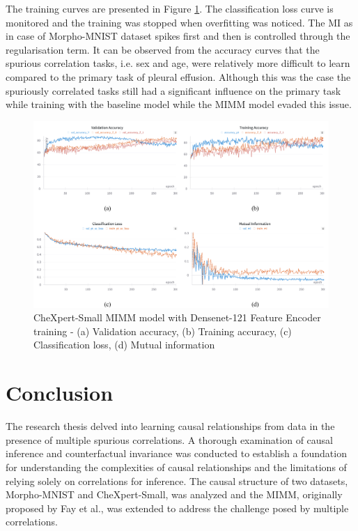 \documentclass[12pt,DIV14,BCOR12mm,a4paper,footinclude=false,headinclude,parskip=half-,twoside,openright,cleardoublepage=empty,toc=index,bibliography=totoc,listof=totoc]{scrreprt}
\numberwithin{equation}{chapter}
\begin{document}
The training curves are presented in Figure \ref{fig:train-curve-chx}. The classification loss curve is monitored and the training was stopped when overfitting was noticed. The MI as in case of Morpho-MNIST dataset spikes first and then is controlled through the regularisation term. It can be observed from the accuracy curves that the spurious correlation tasks, i.e. sex and age, were relatively more difficult to learn compared to the primary task of pleural effusion. Although this was the case the spuriously correlated tasks still had a significant influence on the primary task while training with the baseline model while the MIMM model evaded this issue.

\begin{figure}[H]
\centering
\includegraphics[width=1\linewidth]{thesis/figures/train_chx_curve.pdf}
\caption{CheXpert-Small MIMM model with Densenet-121 Feature Encoder training - (a) Validation accuracy, (b) Training accuracy, (c) Classification loss, (d) Mutual information}
\label{fig:train-curve-chx}
\end{figure}


\chapter{Conclusion}
The research thesis delved into learning causal relationships from data in the presence of multiple spurious correlations. A thorough examination of causal inference and counterfactual invariance was conducted to establish a foundation for understanding the complexities of causal relationships and the limitations of relying solely on correlations for inference. The causal structure of two datasets, Morpho-MNIST and CheXpert-Small, was analyzed and the MIMM, originally proposed by Fay et al., was extended to address the challenge posed by multiple correlations.
\end{document}
